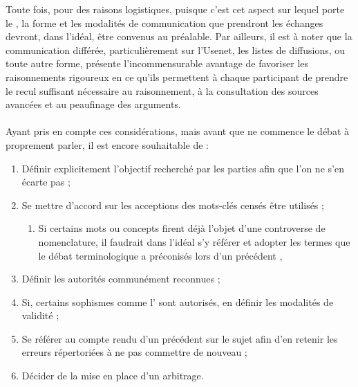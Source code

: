 Toute fois, pour des raisons logistiques, puisque c’est cet aspect sur lequel porte le \mainabbr{}, la forme et les modalités de communication que prendront les échanges devront, dans l’idéal, être convenus au préalable. Par ailleurs, il est à noter que la communication différée, particulièrement sur l’Usenet, les listes de diffusions, ou toute autre forme, présente l’incommensurable avantage de favoriser les raisonnements rigoureux en ce qu’ils permettent à chaque participant de prendre le recul suffisant nécessaire au raisonnement, à la consultation des sources avancées et au peaufinage des arguments.

\paragraph{}
Ayant pris en compte ces considérations, mais avant que ne commence le débat à proprement parler, il est encore souhaitable de :

\begin{enumerate}
  \item Définir explicitement l’objectif recherché par les parties afin que l’on ne s’en écarte pas ;

  \item Se mettre d’accord sur les acceptions des mots-clés censés être utilisés ;

  \begin{enumerate}
    \item Si certains mots ou concepts firent déjà l’objet d’une controverse de nomenclature, il faudrait dans l’idéal s’y référer et adopter les termes que le débat terminologique a préconisés lors d’un précédent \mainabbr{},
  \end{enumerate}

  \item Définir les autorités communément reconnues ;

  \item Si, certains sophismes comme l’ sont autorisés, en définir les modalités de validité ;

  \item Se référer au compte rendu d’un précédent \mainabbr{} sur le sujet afin d’en retenir les erreurs répertoriées à ne pas commettre de nouveau ;

  \item Décider de la mise en place d’un arbitrage.

\end{enumerate}

